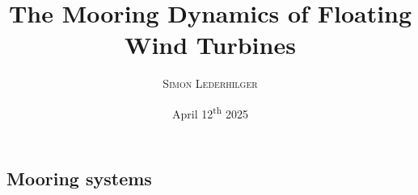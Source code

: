 \documentclass{article}
\title{The Mooring Dynamics of Floating Wind Turbines}
\subtitle{\emph{\headcourse}}
\author{\textsc{Simon Lederhilger}}
\date{April 12\textsuperscript{th} 2025}
\begin{document}
\maketitle\thispagestyle{fancy}
    \begin{multicols*}{2}
        \section[Mooring]{Mooring systems}
    \end{multicols*}
\end{document}
